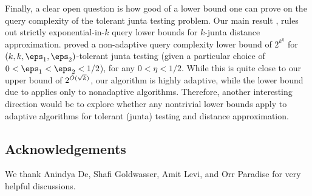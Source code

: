 Finally, a clear open question is how good of a lower bound one can prove on the query complexity of the tolerant junta testing problem. Our main result , rules out strictly exponential-in-$k$ query lower bounds for $k$-junta distance approximation. \cite{junta-lbs-PRW20} proved a non-adaptive query complexity lower bound of $2^{k^\eta}$ for $(k, k, \eps_1,\eps_2)$-tolerant junta testing (given a particular choice of $0 < \eps_1 < \eps_2 < 1/2$), for any $0<\eta<1/2$. While this is quite close to our upper bound of $2^{\Tilde{O}(\sqrt{k})}$, our algorithm is highly adaptive, while the lower bound due to \cite{junta-lbs-PRW20} applies only to nonadaptive algorithms. 
Therefore, another interesting direction would be to explore whether any nontrivial lower bounds  apply to adaptive algorithms for tolerant (junta) testing and distance approximation.

\subsection*{Acknowledgements}
We thank Anindya De, Shafi Goldwasser, Amit Levi, and Orr Paradise for very helpful discussions.



\appendix 

